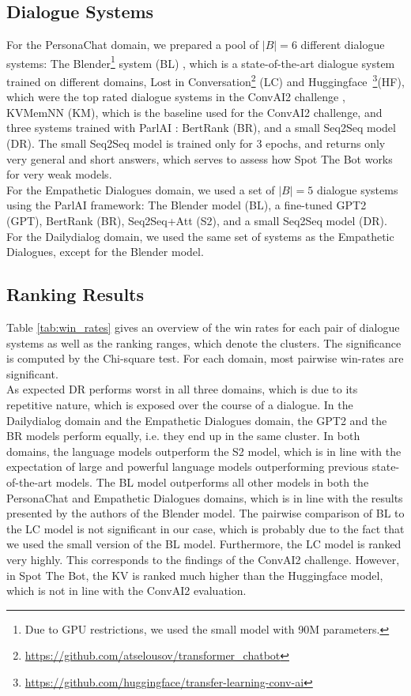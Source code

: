 \documentclass[11pt,a4paper]{article}
\begin{document}
\subsection{Dialogue Systems}
For the PersonaChat domain, we prepared a pool of $|B| = 6$ different dialogue systems: The Blender\footnote{Due to GPU restrictions, we used the small model with 90M parameters.} system (BL) \cite{roller2020recipes}, which is a state-of-the-art dialogue system trained on different domains, Lost in Conversation\footnote{\url{https://github.com/atselousov/transformer\_chatbot}} (LC) and Huggingface~\footnote{\url{https://github.com/huggingface/transfer-learning-conv-ai}}(HF), which were the top rated dialogue systems in the ConvAI2 challenge \cite{dinan2020convai2}, KVMemNN (KM), which is the baseline used for the ConvAI2 challenge, and three systems trained with ParlAI \cite{miller2017parlai}: BertRank (BR), and a small Seq2Seq model (DR). The small Seq2Seq model is trained only for 3 epochs, and returns only very general and short answers, which serves to assess how Spot The Bot works for very weak models.  \\
For the Empathetic Dialogues domain, we used a set of $|B| = 5$ dialogue systems using the ParlAI framework: The Blender model (BL), a fine-tuned GPT2 (GPT), BertRank (BR), Seq2Seq+Att (S2), and a small Seq2Seq model (DR).  \\
For the Dailydialog domain, we used the same set of systems as the Empathetic Dialogues, except for the Blender model.



\subsection{Ranking Results}

Table \ref{tab:win_rates} gives an overview of the win rates for each pair of dialogue systems as well as the ranking ranges, which denote the clusters. The significance is computed by the Chi-square test. For each domain, most pairwise win-rates are significant. \\
As expected DR performs worst in all three domains, which is due to its repetitive nature, which is exposed over the course of a dialogue. In the Dailydialog domain and the Empathetic Dialogues domain, the GPT2 and the BR models perform equally, i.e. they end up in the same cluster. In both domains, the language models outperform the S2 model, which is in line with the expectation of large and powerful language models outperforming previous state-of-the-art models.
The BL model outperforms all other models in both the PersonaChat and Empathetic Dialogues domains, which is in line with the results presented by the authors of the Blender model. The pairwise comparison of BL to the LC model is not significant in our case, which is probably due to the fact that we used the small version of the BL model. Furthermore, the LC model is ranked very highly. This corresponds to the findings of the ConvAI2 challenge. However, in Spot The Bot, the KV is ranked much higher than the Huggingface model, which is not in line with the ConvAI2 evaluation. 
\end{document}
